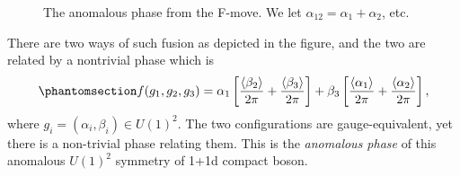\documentclass[
  letterpaper,
  DIV=11,
  numbers=noendperiod]{scrreport}
\begin{document}
\begin{figure}[t]


\caption{\label{fig-F-move}The anomalous phase from the F-move. We let
\(\alpha_{12} = \alpha_1+\alpha_2\), etc.}

\end{figure}%

There are two ways of such fusion as depicted in the figure, and the two
are related by a nontrivial phase which is
\begin{equation}\phantomsection\label{eq-cocycle-boson}{
f(g_1,g_2,g_3) = \alpha_1\left[\frac{\langle\beta_2\rangle}{2\pi}+\frac{\langle\beta_3\rangle}{2\pi}\right]+\beta_3\left[\frac{\langle\alpha_1\rangle}{2\pi}+\frac{\langle\alpha_2\rangle}{2\pi}\right],
}\end{equation} where \(g_i = (\alpha_i,\beta_i)\in U(1)^2\). The two
configurations are gauge-equivalent, yet there is a non-trivial phase
relating them. This is the \emph{anomalous phase} of this anomalous
\(U(1)^2\) symmetry of 1+1d compact boson.
\end{document}
